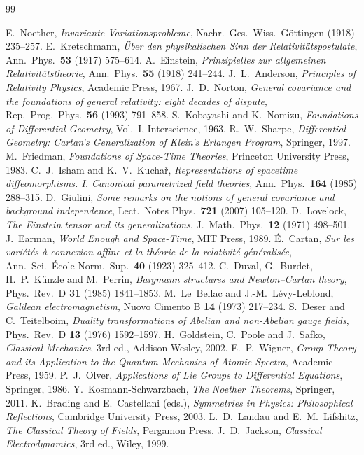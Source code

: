 \documentclass[11pt,a4paper,openany]{book}
\theoremstyle{definition}
\theoremstyle{plain}
\theoremstyle{remark}
\begin{document}
\begin{thebibliography}{99}
 E.~Noether, \emph{Invariante Variationsprobleme},
  Nachr.\ Ges.\ Wiss.\ G\"ottingen (1918) 235--257.
 E.~Kretschmann, \emph{\"Uber den physikalischen Sinn der
  Relativit\"atspostulate}, Ann.\ Phys.\ \textbf{53} (1917) 575--614.
 A.~Einstein, \emph{Prinzipielles zur allgemeinen
  Relativit\"atstheorie}, Ann.\ Phys.\ \textbf{55} (1918) 241--244.
 J.~L.~Anderson, \emph{Principles of Relativity Physics},
  Academic Press, 1967.
 J.~D.~Norton, \emph{General covariance and the foundations of
  general relativity: eight decades of dispute}, Rep.\ Prog.\ Phys.\
  \textbf{56} (1993) 791--858.
 S.~Kobayashi and K.~Nomizu, \emph{Foundations of Differential
  Geometry}, Vol.~I, Interscience, 1963.
 R.~W.~Sharpe, \emph{Differential Geometry: Cartan's
  Generalization of Klein's Erlangen Program}, Springer, 1997.
 M.~Friedman, \emph{Foundations of Space-Time Theories},
  Princeton University Press, 1983.
 C.~J.~Isham and K.~V.~Kucha\v{r}, \emph{Representations of
  spacetime diffeomorphisms. I. Canonical parametrized field theories},
  Ann.\ Phys.\ \textbf{164} (1985) 288--315.
 D.~Giulini, \emph{Some remarks on the notions of general
  covariance and background independence}, Lect.\ Notes Phys.\ \textbf{721}
  (2007) 105--120.
 D.~Lovelock, \emph{The Einstein tensor and its
  generalizations}, J.\ Math.\ Phys.\ \textbf{12} (1971) 498--501.
\bibitem{earman} J.~Earman, \emph{World Enough and Space-Time}, MIT Press, 1989.
\bibitem{cartan} \'E.~Cartan, \emph{Sur les vari\'et\'es \`a connexion affine
  et la th\'eorie de la relativit\'e g\'en\'eralis\'ee}, Ann.\ Sci.\ \'Ecole
  Norm.\ Sup.\ \textbf{40} (1923) 325--412.
 C.~Duval, G.~Burdet, H.~P.~K\"unzle and M.~Perrin,
  \emph{Bargmann structures and Newton--Cartan theory}, Phys.\ Rev.\ D
  \textbf{31} (1985) 1841--1853.
 M.~Le~Bellac and J.-M.~L\'evy-Leblond, \emph{Galilean
  electromagnetism}, Nuovo Cimento B \textbf{14} (1973) 217--234.
\bibitem{deser} S.~Deser and C.~Teitelboim, \emph{Duality transformations of
  Abelian and non-Abelian gauge fields}, Phys.\ Rev.\ D \textbf{13} (1976)
  1592--1597.
 H.~Goldstein, C.~Poole and J.~Safko, \emph{Classical
  Mechanics}, 3rd ed., Addison-Wesley, 2002.
 E.~P.~Wigner, \emph{Group Theory and its Application to the
  Quantum Mechanics of Atomic Spectra}, Academic Press, 1959.
 P.~J.~Olver, \emph{Applications of Lie Groups to Differential
  Equations}, Springer, 1986.
 Y.~Kosmann-Schwarzbach, \emph{The Noether Theorems}, Springer, 2011.
\bibitem{bc} K.~Brading and E.~Castellani (eds.), \emph{Symmetries in Physics:
  Philosophical Reflections}, Cambridge University Press, 2003.
 L.~D.~Landau and E.~M.~Lifshitz, \emph{The Classical Theory of
  Fields}, Pergamon Press.
 J.~D.~Jackson, \emph{Classical Electrodynamics}, 3rd ed.,
  Wiley, 1999.
\end{thebibliography}
\end{document}
